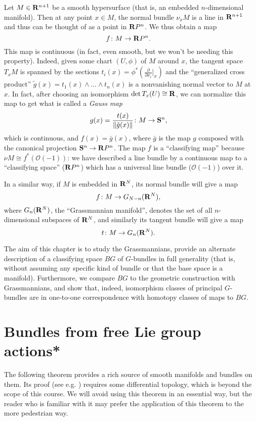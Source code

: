 \documentclass[a4paper,openany]{scrbook}
\begin{document}
Let $M \in \R^{n+1}$ be a smooth hypersurface (that is, an embedded $n$-dimensional manifold). Then at any point $x \in M$, the normal bundle $\nu_x M$ is a line in $\R^{n+1}$ and thus can be thought of as a point in $\R P^n$. We thus obtain a map
\[
f\colon M \to \R P^n.
\]
This map is continuous (in fact, even smooth, but we won't be needing this property). Indeed, given some chart $(U,\phi)$ of $M$ around $x$, the tangent space $T_xM$ is spanned by the sections $t_i(x) = \phi^*(\frac{\partial}{\partial x_i}|_x)$ and the ``generalized cross product'' $\tilde g(x) = t_1(x) \wedge \dots \wedge t_n(x)$ is a nonvanishing normal vector to $M$ at $x$. In fact, after choosing an isomorphism $\det T_x(U) \cong \R$, we can normalize this map to get what is called a \emph{Gauss map}
\[
g(x) = \frac{t(x)}{\|\tilde g(x)\|} \colon M \to \S^n,
\]
which is continuous, and $f(x) = \bar g(x)$, where $\bar g$ is the map $g$ composed with the canonical projection $\S^n \to \R P^n$. The map $f$ is a ``classifying map'' because $\nu M \cong f^*(\mathcal O(-1))$: we have described a line bundle by a continuous map to a ``classifying space'' ($\R P^n$) which has a universal line bundle ($\mathcal O(-1)$) over it.

In a similar way, if $M$ is embedded in $\R^N$, its normal bundle will give a map
\[
f\colon M \to G_{N-n}(\R^N),
\]
where $G_n(\R^N)$, the ``Grassmannian manifold'', denotes the set of all $n$-dimensional subspaces of $\R^N$, and similarly its tangent bundle will give a map
\[
t\colon M \to G_n(\R^N).
\]

The aim of this chapter is to study the Grassmannians, provide an alternate description of a classifying space $BG$ of $G$-bundles in full generality (that is, without assuming any specific kind of bundle or that the base space is a manifold). Furthermore, we compare $BG$ to the geometric construction with Grassmannians, and show that, indeed, isomorphism classes of principal $G$-bundles are in one-to-one correspondence with homotopy classes of maps to $BG$.

\section{Bundles from free Lie group actions*}

The following theorem provides a rich source of smooth manifolds and bundles on them. Its proof (see e.g. \cite[Chapter 7]{lee:smooth-manifolds}) requires some differential topology, which is beyond the scope of this course. We will avoid using this theorem in an essential way, but the reader who is familiar with it may prefer the application of this theorem to the more pedestrian way.
\end{document}
